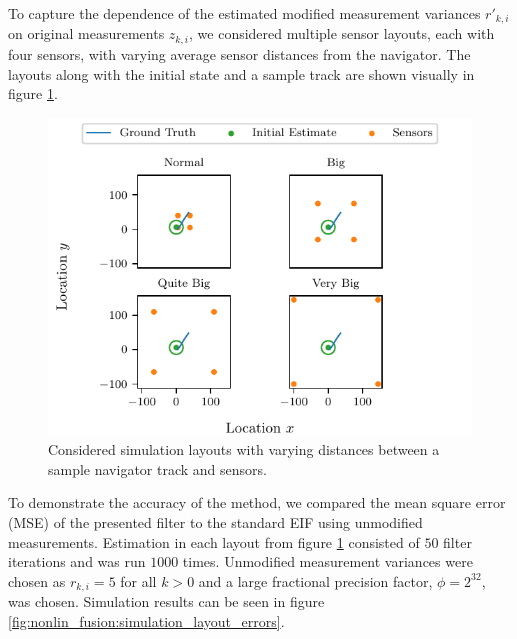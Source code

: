 To capture the dependence of the estimated modified measurement variances $r'_{k, i}$ on original measurements $z_{k, i}$, we considered multiple sensor layouts, each with four sensors, with varying average sensor distances from the navigator. The layouts along with the initial state and a sample track are shown visually in figure \ref{fig:nonlin_fusion:simulation_layouts}.
\begin{figure}[htbp]
    \centering
    \includegraphics{figures/nonlin_fusion_simulation_layouts.pdf}
    \caption{Considered simulation layouts with varying distances between a sample navigator track and sensors.}
    \label{fig:nonlin_fusion:simulation_layouts}
\end{figure}
To demonstrate the accuracy of the method, we compared the mean square error (MSE) of the presented filter to the standard EIF using unmodified measurements. Estimation in each layout from figure \ref{fig:nonlin_fusion:simulation_layouts} consisted of $50$ filter iterations and was run $1000$ times. Unmodified measurement variances were chosen as $r_{k, i}=5$ for all $k>0$ and a large fractional precision factor, $\phi=2^{32}$, was chosen. Simulation results can be seen in figure \ref{fig:nonlin_fusion:simulation_layout_errors}.
